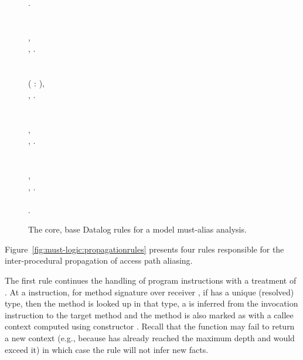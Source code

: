 \begin{figure}[htp]
\begin{datalog}
 \dlIf{} . \\
\\
 \dlIf{} \\
    , \\
    , . \\
\\
 \dlIf{} \\
    (\dlforall{} :  \dlThen{} ), \\
    , . \\
\\
 \dlIf{} \\
    , \\
    , . \\
\\
 \dlIf{} \\
    , \\
    , . \\
\\
 \dlIf{} .
\end{datalog}
\caption[]{The core, base Datalog rules for a model must-alias analysis.}
\label{fig:must-logic:baserules}
\end{figure}


Figure~\ref{fig:must-logic:propagationrules} presents four rules responsible for the inter-procedural propagation of access path aliasing.

The first rule continues the handling of program instructions with a treatment of . At a  instruction, for method signature  over receiver , if  has a unique (resolved) type, then the method is looked up in that type, a  is inferred from the invocation instruction to the target method and the method is also marked as  with a callee context computed using constructor . Recall that the  function may fail to return a new context (e.g., because  has already reached the maximum depth and  would exceed it) in which case the rule will not infer new facts.

